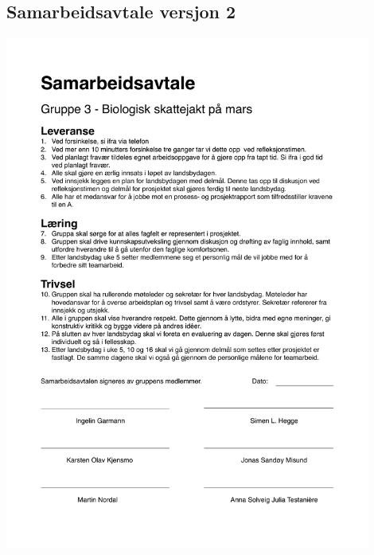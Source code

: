\begin{appendices}
\section{Samarbeidsavtale versjon 2}
\label{Ved:samarbeidsavtale_2}
\begin{center}
	\includegraphics[width=0.9\textwidth]{Samarbeidsavtale_2.pdf}
\end{center}

\end{appendices}